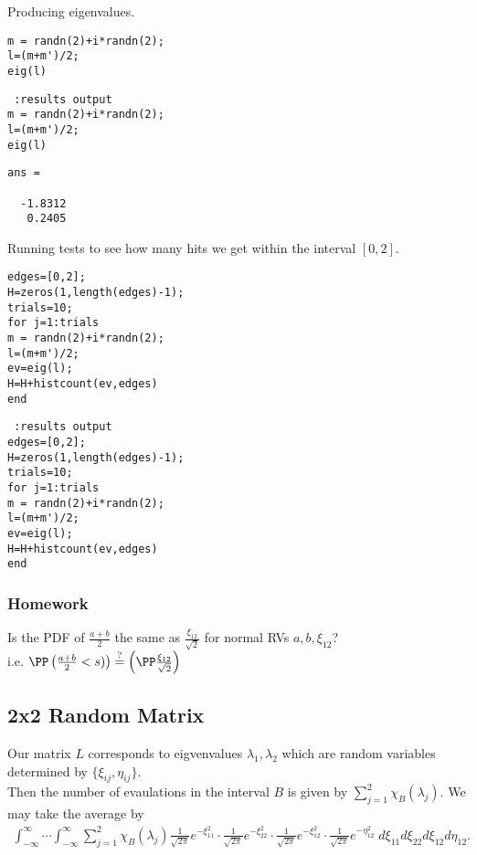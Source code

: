 \documentclass[11pt]{article}
\begin{document}
Producing eigenvalues.\\
\begin{verbatim}
m = randn(2)+i*randn(2);
l=(m+m')/2;
eig(l)
\end{verbatim}
\begin{verbatim} :results output
m = randn(2)+i*randn(2);
l=(m+m')/2;
eig(l)
\end{verbatim}

\label{}
\begin{verbatim}
ans =

  -1.8312
   0.2405
\end{verbatim}



Running tests to see how many hits we get within the interval \([0,2]\).\\
\begin{verbatim}
edges=[0,2];
H=zeros(1,length(edges)-1);
trials=10;
for j=1:trials
m = randn(2)+i*randn(2);
l=(m+m')/2;
ev=eig(l);
H=H+histcount(ev,edges)
end
\end{verbatim}

\begin{verbatim} :results output
edges=[0,2];
H=zeros(1,length(edges)-1);
trials=10;
for j=1:trials
m = randn(2)+i*randn(2);
l=(m+m')/2;
ev=eig(l);
H=H+histcount(ev,edges)
end
\end{verbatim}
\subsubsection*{Homework}
\label{sec:orgeaeac7d}
Is the PDF of \(\frac{a+b}{2}\) the same as \(\frac{\xi_{12}}{\sqrt{2}}\) for normal RVs \(a,b,\xi_{12}\)?\\
i.e. \(\PP\left( \frac{a+b}{2}<s) \right)\overset{?}{=}\left( \PP\frac{\xi_{12}}{\sqrt{2}} \right)\)\\
\subsection*{2x2 Random Matrix}
\label{sec:org3c8daf1}
Our matrix \(L\) corresponds to eigvenvalues \(\lambda_{1},\lambda_{2}\) which are random variables determined by \(\{\xi_{ij},\eta_{ij}\}\).\\
Then the number of evaulations in the interval \(B\) is given by \(\sum_{j=1}^{2}\chi_{B}(\lambda_{j})\). We may take the average by\\
\begin{align*}
  \int_{-\infty}^{\infty}\cdots\int_{-\infty}^{\infty}\sum_{j=1}^{2}\chi_{B}(\lambda_{j})\frac{1}{\sqrt{2\pi}}e^{-\xi^{2}_{11}}\cdot\frac{1}{\sqrt{2\pi}}e^{-\xi^{2}_{22}}\cdot\frac{1}{\sqrt{2\pi}}e^{-\xi^{2}_{12}}\cdot\frac{1}{\sqrt{2\pi}}e^{-\eta^{2}_{12}}\;d\xi_{11}d\xi_{22}d\xi_{12}d\eta_{12}.
\end{align*}
\end{document}
